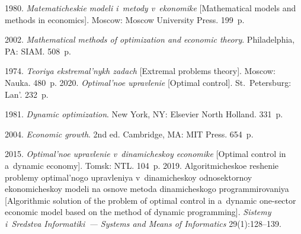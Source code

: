 

\vspace*{-4pt}

  \begin{multicols}{2}

\renewcommand{\bibname}{\protect\rmfamily References}

{\small\frenchspacing
 {%
 \begin{thebibliography}{99}
 
 \vspace*{-2pt}


 1980. \textit{Matematicheskie modeli i~metody v~ekonomike} [Mathematical models 
and methods in economics]. Moscow: Moscow University Press. 199~p. 


 2002. \textit{Mathematical methods of optimization and economic theory}. Philadelphia, 
PA: SIAM. 508~p.
{

}

\columnbreak 


 1974. \textit{Teoriya ekst\-re\-mal'\-nykh zadach} [Extremal problems 
theory]. Moscow: Nauka. 480~p.
 2020. \textit{Optimal'noe upravlenie} [Optimal control]. St.\ 
Petersburg: Lan'.  232~p.
{ %

}



 1981. \textit{Dynamic optimization}. New York, NY: Elsevier North 
Holland. 331~p.

\pagebreak

 2004. \textit{Economic growth}. 2nd ed. Cambridge, MA: MIT Press. 
654~p.



 2015. \textit{Optimal'noe upravlenie v~di\-na\-mi\-che\-skoy economike} [Optimal control in 
a~dynamic economy]. \mbox{Tomsk}: NTL. 104~p.
 2019. Al\-go\-rit\-mi\-che\-skoe reshenie problemy optimal'nogo upravleniya 
v~di\-na\-mi\-che\-skoy odnosektornoy ekonomicheskoy modeli na osnove metoda di\-na\-mi\-che\-sko\-go programmirovaniya 
[Algorithmic solution of the problem of optimal control in \mbox{a~dynamic} one-sector economic model based on the 
method of dynamic programming]. \textit{Sistemy i~Sredstva Informatiki~--- Systems and Means of Informatics} 
29(1):128--139.
{ %

}
\end{thebibliography}}}
\end{multicols}
